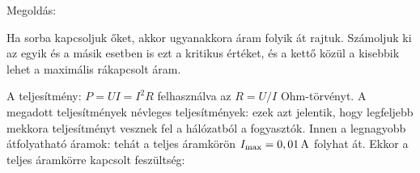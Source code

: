
\ifdefined\megoldas

 Megoldás: 

 Ha sorba kapcsoljuk őket, akkor ugyanakkora áram folyik át rajtuk. Számoljuk ki az egyik és a másik esetben is ezt a kritikus értéket, és a kettő közül a kisebbik lehet a maximális rákapcsolt áram. 

 A teljesítmény: $P=UI=I^2 R$ felhasználva az $R=U/I$ Ohm-törvényt. A megadott teljesítmények névleges teljesítmények: ezek azt jelentik, hogy legfeljebb mekkora teljesítményt vesznek fel a hálózatból a fogyasztók. Innen a legnagyobb átfolyatható áramok:
 tehát a teljes áramkörön $I_\text{max}=0,01\mathrm{\, A}$ folyhat át. Ekkor a teljes áramkörre kapcsolt feszültség:
 
\fi